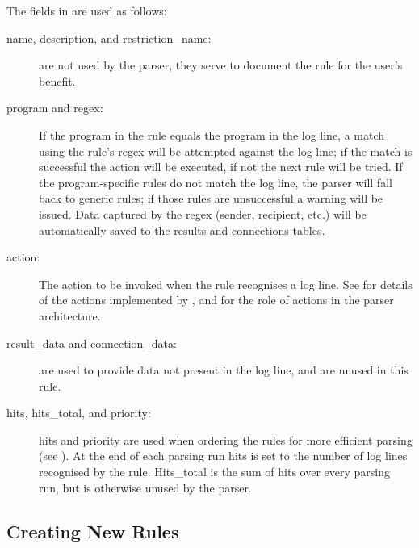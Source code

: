 The fields in  are used as
follows:

\begin{description}

    \item [name, description, and restriction\_name:] are not used by the
        parser, they serve to document the rule for the user's benefit.

    \item [program and regex:] If the program in the rule equals the
        program in the log line, a match using the rule's regex will be
        attempted against the log line; if the match is successful the
        action will be executed, if not the next rule will be tried.  If
        the program-specific rules do not match the log line, the parser
        will fall back to generic rules; if those rules are unsuccessful a
        warning will be issued.  Data captured by the regex (sender,
        recipient, etc.) will be automatically saved to the results and
        connections tables.

    \item [action:] The action to be invoked when the rule recognises a log
        line.  See  for
        details of the actions implemented by \parsername{}, and
         for the role of actions in the
        parser architecture.

    \item [result\_data and connection\_data:] are used to provide data not
        present in the log line, and are unused in this rule.

    \item [hits, hits\_total, and priority:] hits and priority are used
        when ordering the rules for more efficient parsing (see
        ).  At the end of each
        parsing run hits is set to the number of log lines recognised by
        the rule.  Hits\_total is the sum of hits over every parsing run,
        but is otherwise unused by the parser.

\end{description}

\subsection{Creating New Rules}

\label{creating new rules in implementation}

